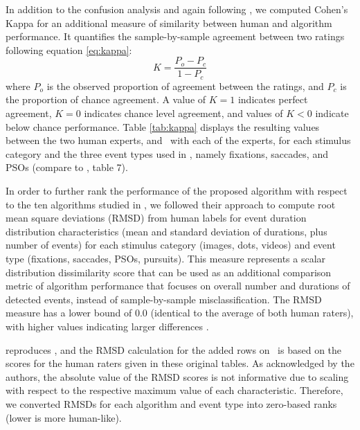 In addition to the confusion analysis and again following \citet{Andersson2017},
we computed Cohen's Kappa \citep{cohen1960coefficient} for an additional measure
of similarity between human and algorithm performance. It quantifies the
sample-by-sample agreement between two ratings following equation \ref{eq:kappa}:
%
\begin{equation}\label{eq:kappa}
K = \frac{P_o - P_c}{1- P_c}
\end{equation}
%
where $P_o$ is the observed proportion of agreement between the ratings, and
$P_c$ is the proportion of chance agreement. A value of $K=1$ indicates perfect
agreement, $K=0$ indicates chance level agreement, and values of $K<0$ indicate
below chance performance. Table \ref{tab:kappa} displays the resulting values
between the two human experts, and \remodnav\ with each of the experts, for
each stimulus category and the three event types used in \citet{Andersson2017},
namely fixations, saccades, and PSOs (compare to \citet{Andersson2017}, table 7).


In order to further rank the performance of the proposed algorithm with respect
to the ten algorithms studied in \citet{Andersson2017}, we followed their
approach to compute root mean square deviations (RMSD) from human labels for
event duration distribution characteristics (mean and standard deviation of
durations, plus number of events) for each stimulus category (images, dots,
videos) and event type (fixations, saccades, PSOs, pursuits). This measure
represents a scalar distribution dissimilarity score that can be used as an
additional comparison metric of algorithm performance that focuses on overall
number and durations of detected events, instead of sample-by-sample
misclassification. The RMSD measure has a lower bound of $0.0$ (identical to
the average of both human raters), with higher values indicating larger
differences \citep[for detail information on the calculation of this metric
see][]{Andersson2017}.

 reproduces \citet[Tables
3-6]{Andersson2017}, and the RMSD calculation for the added rows on \remodnav\
is based on the scores for the human raters given in these original tables. As
acknowledged by the authors, the absolute value of the RMSD scores is not
informative due to scaling with respect to the respective maximum value of each
characteristic.  Therefore, we converted RMSDs for each algorithm and event
type into zero-based ranks (lower is more human-like).

